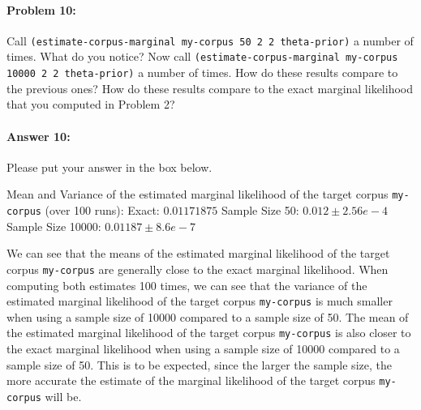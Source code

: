 \documentclass[10pt]{article}
\newenvironment{AnswerBox}{\begin{mdframed}[style=simple]}{\end{mdframed}}
\begin{document}
\hrulefill %

\paragraph{Problem 10:}

 Call \texttt{(estimate-corpus-marginal my-corpus 50 2 2
  theta-prior)} a number of times. What do you notice? Now call
\texttt{(estimate-corpus-marginal my-corpus 10000 2 2 theta-prior)} a
number of times. How do these results compare to the previous ones?
How do these results compare to the exact marginal
likelihood that you computed in Problem 2?

\paragraph{Answer 10:} Please put your answer in the box below.

\begin{AnswerBox}%

    Mean and Variance of the estimated marginal likelihood of the target corpus \texttt{my-corpus} (over 100 runs):\newline
    Exact: $0.01171875$\newline
    Sample Size 50: $0.012 \pm 2.56e-4$\newline
    Sample Size 10000: $0.01187 \pm 8.6e-7$\newline

    We can see that the means of the estimated marginal likelihood of the target corpus \texttt{my-corpus} are generally close to the exact marginal likelihood. When computing both estimates 100 times, we can see that the variance of the estimated marginal likelihood of the target corpus \texttt{my-corpus} is much smaller when using a sample size of 10000 compared to a sample size of 50. The mean of the estimated marginal likelihood of the target corpus \texttt{my-corpus} is also closer to the exact marginal likelihood when using a sample size of 10000 compared to a sample size of 50. This is to be expected, since the larger the sample size, the more accurate the estimate of the marginal likelihood of the target corpus \texttt{my-corpus} will be.
    
\end{AnswerBox}%
 

\hrulefill %
\end{document}
